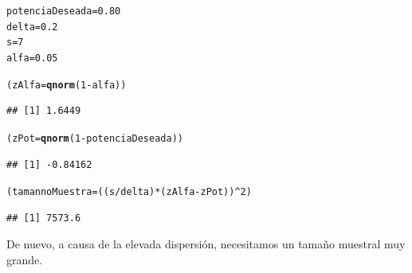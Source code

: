 \documentclass[10pt,a4paper]{article}\usepackage[]{graphicx}\usepackage[]{color}
\makeatletter
\newcommand{\hlnum}[1]{\textcolor[rgb]{0.686,0.059,0.569}{#1}}%
\newcommand{\hlopt}[1]{\textcolor[rgb]{0,0,0}{#1}}%
\newcommand{\hlstd}[1]{\textcolor[rgb]{0.345,0.345,0.345}{#1}}%
\newcommand{\hlkwb}[1]{\textcolor[rgb]{0.69,0.353,0.396}{#1}}%
\newcommand{\hlkwd}[1]{\textcolor[rgb]{0.737,0.353,0.396}{\textbf{#1}}}%
\newenvironment{kframe}{%
 \def\at@end@of@kframe{}%
 \ifinner\ifhmode%
  \def\at@end@of@kframe{\end{minipage}}%
  \begin{minipage}{\columnwidth}%
 \fi\fi%
 \def\FrameCommand##1{\hskip\@totalleftmargin \hskip-\fboxsep
 \colorbox{shadecolor}{##1}\hskip-\fboxsep
     \hskip-\linewidth \hskip-\@totalleftmargin \hskip\columnwidth}%
 \MakeFramed {\advance\hsize-\width
   \@totalleftmargin\z@ \linewidth\hsize
   \@setminipage}}%
 {\par\unskip\endMakeFramed%
 \at@end@of@kframe}
\newenvironment{knitrout}{}{} %
\makeatother
\begin{document}
\begin{knitrout}
\color{fgcolor}\begin{kframe}
\begin{alltt}
\hlstd{potenciaDeseada} \hlkwb{=} \hlnum{0.80}
\hlstd{delta} \hlkwb{=} \hlnum{0.2}
\hlstd{s} \hlkwb{=} \hlnum{7}
\hlstd{alfa} \hlkwb{=} \hlnum{0.05}

\hlstd{(zAlfa} \hlkwb{=} \hlkwd{qnorm}\hlstd{(}\hlnum{1}\hlopt{-} \hlstd{alfa))}
\end{alltt}
\begin{verbatim}
## [1] 1.6449
\end{verbatim}
\begin{alltt}
\hlstd{(zPot} \hlkwb{=} \hlkwd{qnorm}\hlstd{(}\hlnum{1} \hlopt{-} \hlstd{potenciaDeseada))}
\end{alltt}
\begin{verbatim}
## [1] -0.84162
\end{verbatim}
\begin{alltt}
\hlstd{(tamannoMuestra} \hlkwb{=}  \hlstd{( (s} \hlopt{/} \hlstd{delta)} \hlopt{*} \hlstd{(zAlfa} \hlopt{-} \hlstd{zPot))}\hlopt{^}\hlnum{2}\hlstd{)}
\end{alltt}
\begin{verbatim}
## [1] 7573.6
\end{verbatim}
\end{kframe}
\end{knitrout}
De nuevo, a causa de la elevada dispersión, necesitamos un tamaño muestral muy grande.
\end{document}
